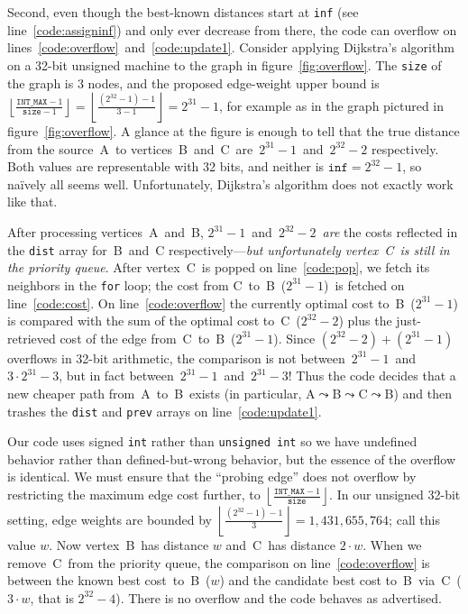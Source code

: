 Second, even though the best-known distances start at \texttt{inf}
(see line~\ref{code:assigninf}) and only ever decrease from there, the code can
overflow on lines~\ref{code:overflow}~and~\ref{code:update1}.
Consider applying Dijkstra's algorithm on a 32-bit unsigned machine to
the graph in figure~\ref{fig:overflow}.  The \texttt{size} of the graph is 3 nodes, and the proposed edge-weight upper bound is $\left\lfloor\frac{\texttt{INT\_MAX}-1}{\texttt{size}-1}\right\rfloor = \left\lfloor\frac{(2^{32}-1)-1}{3-1}\right\rfloor = 2^{31}-1$, for example as in the graph pictured in figure~\ref{fig:overflow}.  A glance at the figure is enough to tell that the true distance from the source~A~to vertices~B~and~C~are~$2^{31}-1$~and~$2^{32}-2$ respectively. Both values are representable with 32 bits, and neither is $\texttt{inf}=2^{32}-1$, so na\"ively all seems well. Unfortunately, Dijkstra's algorithm does not exactly work like that.

After processing vertices~A~and~B, $2^{31}-1$~and~$2^{32}-2$~\emph{are} the costs reflected in the \texttt{dist} array for~B~and~C respectively---\emph{but unfortunately vertex~C~is still in the priority queue}.  After vertex~C~is popped on line~\ref{code:pop}, we fetch its neighbors in the \texttt{for} loop; the cost from C~to~B~($2^{31}-1$)~is fetched on line~\ref{code:cost}.  On line~\ref{code:overflow} the currently optimal cost to~B~($2^{31}-1$) is compared with the sum of the optimal cost to~C~($2^{32}-2$) plus the just-retrieved cost of the edge from~C~to~B~($2^{31}-1$).  Since $(2^{32}-2)+(2^{31}-1)$ overflows in 32-bit arithmetic, the comparison is not between~$2^{31}-1$~and~$3 \cdot 2^{31} - 3$, but in fact between~$2^{31}-1$~and~$2^{31}-3$!  Thus the code decides that a new cheaper path from~A~to~B~exists (in particular, A$\leadsto$B$\leadsto$C$\leadsto$B) and then trashes the \texttt{dist} and \texttt{prev} arrays on line~\ref{code:update1}.

Our code uses signed \texttt{int} rather than \texttt{unsigned int} so we have undefined behavior rather than defined-but-wrong behavior, but the essence of the overflow is identical.  We must ensure that the ``probing edge'' does not overflow by restricting the maximum edge cost further, to $\left\lfloor\frac{\texttt{INT\_MAX}-1}{\texttt{size}}\right\rfloor$.  In our unsigned 32-bit setting, edge weights are bounded by $\left\lfloor\frac{(2^{32}-1)-1}{3}\right\rfloor=1,431,655,764$; call this value $w$.  Now vertex~B~has distance $w$ and~C~has distance $2 \cdot w$.  When we remove~C~from the priority queue, the comparison on line~\ref{code:overflow} is between the known best cost~to~B~($w$) and the candidate best cost to~B~via~C~($3 \cdot w$, that is $2^{32} - 4$).  There is no overflow and the code behaves as advertised.

